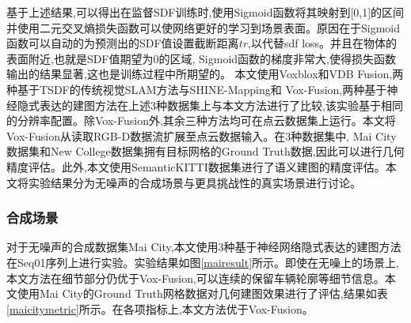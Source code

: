 基于上述结果,可以得出在监督SDF训练时,使用Sigmoid函数将其映射到[0,1]的区间并使用二元交叉熵损失函数可以使网络更好的学习到场景表面。原因在于Sigmoid函数可以自动的为预测出的SDF值设置截断距离$tr$,以代替sdf loss。并且在物体的表面附近,也就是SDF值期望为0的区域, Sigmoid函数的梯度非常大,使得损失函数输出的结果显著,这也是训练过程中所期望的。
\clearpage
本文使用Voxblox和VDB Fusion,两种基于TSDF的传统视觉SLAM方法与SHINE-Mapping和 Vox-Fusion,两种基于神经隐式表达的建图方法在上述3种数据集上与本文方法进行了比较,该实验基于相同的分辨率配置。除Vox-Fusion外,其余三种方法均可在点云数据集上运行。本文将Vox-Fusion从读取RGB-D数据流扩展至点云数据输入。在3种数据集中, Mai City数据集和New College数据集拥有目标网格的Ground Truth数据,因此可以进行几何精度评估。此外,本文使用SemanticKITTI数据集进行了语义建图的精度评估。本文将实验结果分为无噪声的合成场景与更具挑战性的真实场景进行讨论。
\subsubsection{合成场景}
对于无噪声的合成数据集Mai City,本文使用3种基于神经网络隐式表达的建图方法在Seq01序列上进行实验。实验结果如图\ref{mairesult}所示。即使在无噪上的场景上,本文方法在细节部分仍优于Vox-Fusion,可以连续的保留车辆轮廓等细节信息。本文使用Mai City的Ground Truth网格数据对几何建图效果进行了评估,结果如表\ref{maicitymetric}所示。在各项指标上,本文方法优于Vox-Fusion。

